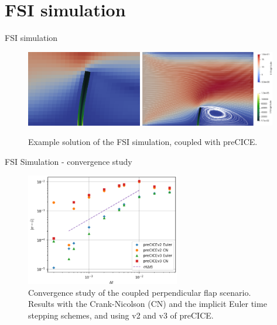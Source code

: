 \documentclass[
  english,            %
  aspectratio=43,    %
]{tumbeamer}
\begin{document}
\section{FSI simulation}
\begin{frame}{FSI simulation}
\vspace*{\fill}

    \begin{figure}[!ht]
    \centering
    \includegraphics[width=0.45\textwidth]{resources/FSI_small.png}
    \includegraphics[width=0.523\textwidth]{resources/FSI_big.png}
    \caption{Example solution of the FSI simulation, coupled with preCICE.}
    \label{fig:FSI}
\end{figure}
\end{frame}

\begin{frame}{FSI Simulation - convergence study}
    \vspace{15pt}
    \begin{figure}[!ht]
    \centering
    \includegraphics[width=0.6\textwidth]{resources/coupled_v2_v3_results.png}
    \caption{Convergence study of the coupled perpendicular flap scenario. Results with the Crank-Nicolson (CN) and the implicit Euler time stepping schemes, and using v2 and v3 of preCICE.}
    \label{fig:coupled_v2_v3}
\end{figure}
\end{frame}
\end{document}
